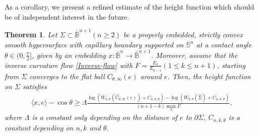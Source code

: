 \documentclass[11pt,reqno]{amsart}
\newtheorem{thm}{Theorem}[section]
\theoremstyle{definition}
\theoremstyle{remark}
\numberwithin{equation}{section}
\renewcommand{\(}{\left(}
\renewcommand{\)}{\right)}
\renewcommand{\-}{\overline}
\begin{document}
As a corollary, we present a refined estimate of the height function which should be of independent interest in the future.
\begin{thm}
	Let $\Sigma\subset\bar{\mathbb{B}}^{n+1} (n\geq 2)$ be a properly embedded, strictly convex smooth hypersurface with capillary boundary supported on $\mathbb{S}^n$ at a contact angle $\theta\in(0,\frac{\pi}{2}]$, given by an embedding $x:\bar{\mathbb{B}}^n\to\bar{\mathbb{B}}^{n+1}$. Moreover, assume that the inverse curvature flow \eqref{Inverse-flow} with $F=\frac{E_{k}}{E_{k-1}}(1\leq k\leq n+1)$, starting from $\Sigma$ converges to the flat ball $C_{\theta,\infty}(e)$ around $e$.
	Then, the height function on $\Sigma$ satisfies
	\begin{align}\label{est-height}
		\langle x,e\rangle-\cos\theta\geq \Lambda\frac{\log(	W_{k,\theta}(\widehat{C}_{\theta,\infty}(e))+C_{n,k,\theta})-\log(	W_{k,\theta}(\widehat{\Sigma})+C_{n,k,\theta})}{(n+1-k)\max_{\Sigma}F},
 	\end{align}
 	where $\Lambda$ is a constant only depending on the distance of $e$ to $\partial\Sigma$, $C_{n,k,\theta}$ is a constant depending on $n,k$ and $\theta$.
\end{thm}
\end{document}
